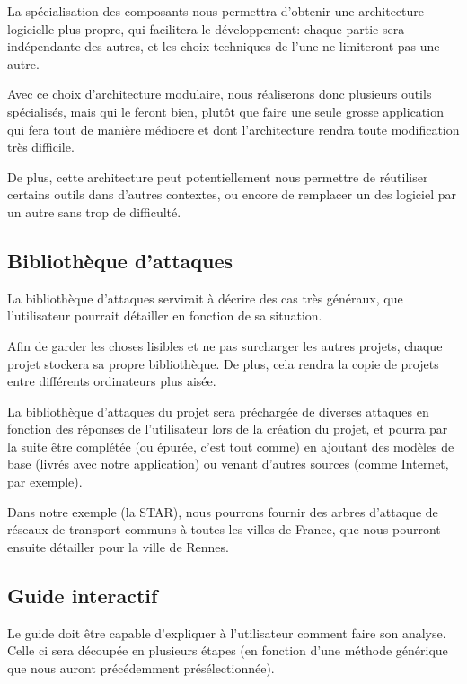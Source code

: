         La spécialisation des composants nous permettra d’obtenir une architecture logicielle plus propre, qui facilitera le développement: chaque partie sera indépendante des autres, et les choix techniques de l'une ne limiteront pas une autre.

        Avec ce choix d'architecture modulaire, nous réaliserons donc plusieurs outils spécialisés, mais qui le feront bien, plutôt que faire une seule grosse application qui fera tout de manière médiocre et dont l'architecture rendra toute modification très difficile.
        
        De plus, cette architecture peut potentiellement nous permettre de réutiliser certains outils dans d'autres contextes, ou encore de remplacer un des logiciel par un autre sans trop de difficulté. 
    
    \subsection{Bibliothèque d'attaques}  
        \label{subsec:biblio_atk}
        La bibliothèque d'attaques servirait à décrire des cas très généraux, que l'utilisateur pourrait détailler en fonction de sa situation. 
        
        Afin de garder les choses lisibles et ne pas surcharger les autres projets, chaque projet stockera sa propre bibliothèque. De plus, cela rendra la copie de projets entre différents ordinateurs plus aisée.
        
        La bibliothèque d'attaques du projet sera préchargée de diverses attaques en fonction des réponses de l'utilisateur lors de la création du projet, et pourra par la suite être complétée (ou épurée, c'est tout comme) en ajoutant des modèles de base (livrés avec notre application) ou venant d'autres sources (comme Internet, par exemple).
        
        Dans notre exemple (la STAR), nous pourrons fournir des arbres d'attaque de réseaux de transport communs à toutes les villes de France, que nous pourront ensuite détailler pour la ville de Rennes.
      
    \subsection{Guide interactif}
        \label{subsec:guide_inter}
        Le guide doit être capable d'expliquer à l'utilisateur comment faire son analyse. Celle ci sera découpée en plusieurs étapes (en fonction d'une méthode générique que nous auront précédemment présélectionnée).


